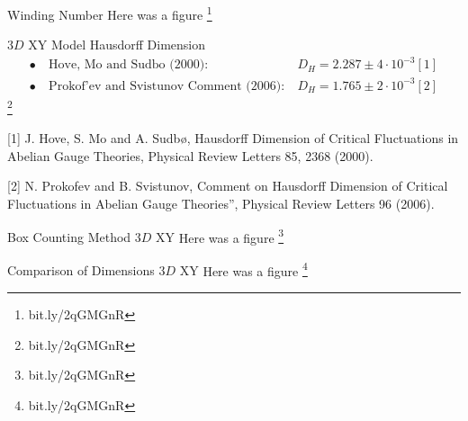 \documentclass[10pt]{beamer}
\newcommand\blfootnote[1]{%
  \begingroup
  \renewcommand\thefootnote{}\footnote{#1}%
  \addtocounter{footnote}{-1}%
  \endgroup
}
\begin{document}
\begin{frame}{Winding Number}
            Here was a figure
    \blfootnote{bit.ly/2qGMGnR}
\end{frame}

\begin{frame}{$3D$ XY Model Hausdorff Dimension}
    \begin{align*}
        \bullet \ &\text{Hove, Mo and Sudbo (2000):}\ &D_H = 2.287 \pm 4 \cdot 10^{-3} [1] \\
        \bullet \ &\text{Prokof'ev and Svistunov Comment (2006):} \ &D_H = 1.765 \pm 2 \cdot 10^{-3} [2]
    \end{align*}
    \blfootnote{bit.ly/2qGMGnR}
        

\footnotesize [1] J. Hove, S. Mo and A. Sudbø, Hausdorff Dimension of Critical Fluctuations in Abelian Gauge Theories, Physical Review Letters 85, 2368 (2000).

\footnotesize [2] N. Prokofev and B. Svistunov, Comment on Hausdorff Dimension of Critical Fluctuations in Abelian Gauge Theories”, Physical Review Letters 96 (2006).

\end{frame}

\begin{frame}{Box Counting Method $3D$ XY}
           Here was a figure
    \blfootnote{bit.ly/2qGMGnR}
\end{frame}

\begin{frame}{Comparison of Dimensions $3D$ XY}
            Here was a figure
    \blfootnote{bit.ly/2qGMGnR}
\end{frame}
\end{document}
